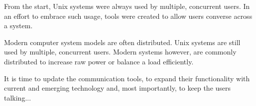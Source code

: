 
From the start, Unix systems were always used by multiple, concurrent
users. In an effort to embrace such usage, tools were created to
allow users converse across a system.


Modern computer system models are often distributed. Unix systems are
still used by multiple, concurrent users. Modern systems however, are 
commonly distributed to increase raw power or balance a load 
efficiently. 


It is time to update the communication tools, to expand their
functionality with current and emerging technology and, most
importantly, to keep the users talking...
